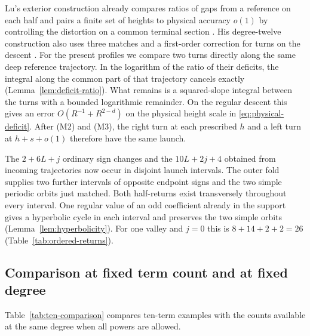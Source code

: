 Lu's exterior construction already compares ratios of gaps from a
reference on each half and pairs a finite set of heights to physical
accuracy $o(1)$ by controlling the distortion on a common terminal
section \cite[Proposition~3.3 and Lemma~3.4]{LuDegree}. His
degree-twelve construction also uses three matches and a first-order
correction for turns on the descent \cite[supplement, \S S5]{LuDegree}.
For the present profiles we compare two turns directly along the same
deep reference trajectory. In the logarithm of the ratio of their
deficits, the integral along the common part of that trajectory cancels
exactly (Lemma~\ref{lem:deficit-ratio}). What remains is a squared-slope
integral between the turns with a bounded logarithmic remainder.
On the regular descent this gives an error $O(R^{-1}+R^{2-d})$ on the
physical height scale in \eqref{eq:physical-deficit}. After (M2) and
(M3), the right turn at each prescribed $h$ and a left turn at
$h+s+o(1)$ therefore have the same launch.

The $2+6L+j$ ordinary sign changes and the $10L+2j+4$ obtained from
incoming trajectories now occur in disjoint launch intervals. The
outer fold supplies two further intervals of opposite endpoint signs
and the two simple periodic orbits just matched. Both half-returns exist
transversely throughout every interval. One regular value of an odd
coefficient already in the support gives a hyperbolic cycle in each
interval and preserves the two simple orbits
(Lemma~\ref{lem:hyperbolicity}). For one valley and $j=0$ this is
$8+14+2+2=26$ (Table~\ref{tab:ordered-returns}).

\subsection{Comparison at fixed term count and at fixed degree}\label{subsec:other-comparisons}
Table~\ref{tab:ten-comparison} compares ten-term examples with the
counts available at the same degree when all powers are allowed.

